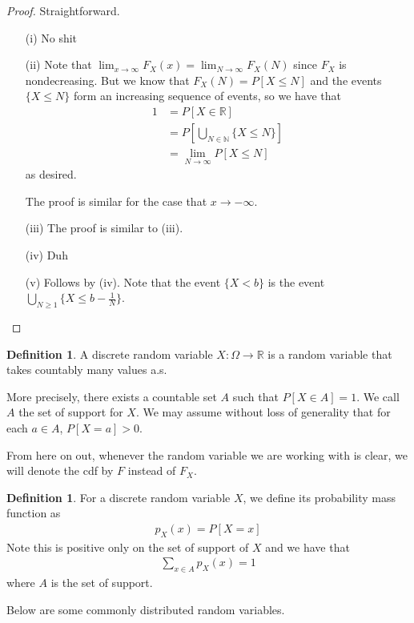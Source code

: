 \documentclass[11pt]{amsart}
\theoremstyle{definition}
\newtheorem{definition}[theorem]{Definition}
\numberwithin{equation}{section}
\begin{document}
\begin{proof} Straightforward.
    \begin{enumerate}
        \item [(i)] No shit
        \item [(ii)] Note that $\lim_{x\to\infty}F_X(x)=\lim_{N\to\infty}F_X(N)$ since $F_X$ is nondecreasing. But we know that $F_X(N)=P[X\le N]$ and the events $\{X\le N\}$ form an increasing sequence of events, so we have that 
        \begin{align*}
            1&=P[X\in\mathbb R]\\
            &=P[\bigcup_{N\in\mathbb N} \{X\le N\}]\\
            &=\lim_{N\to\infty}P[X\le N]
        \end{align*}
        as desired.

        The proof is similar for the case that $x\to-\infty$.
        \item [(iii)] The proof is similar to (iii).
        \item [(iv)] Duh
        \item [(v)] Follows by (iv). Note that the event $\{X<b\}$ is the event $\bigcup_{N\ge 1}\{X\le b-\frac{1}{N}\}$.
    \end{enumerate}
\end{proof}
\begin{definition}
    A discrete random variable $X:\Omega\to\mathbb R$ is a random variable that takes countably many values a.s.

    More precisely, there exists a countable set $A$ such that $P[X\in A]=1$. We call $A$ the set of support for $X$. We may assume without loss of generality that for each $a\in A$, $P[X=a]>0$.
\end{definition}
From here on out, whenever the random variable we are working with is clear, we will denote the cdf by $F$ instead of $F_X$.
\begin{definition}
    For a discrete random variable $X$, we define its probability mass function as
    \begin{align*}
        p_X(x)=P[X=x]
    \end{align*}
    Note this is positive only on the set of support of $X$ and we have that
    \begin{align*}
        \sum_{x\in A}p_X(x)=1
    \end{align*}
    where $A$ is the set of support.
\end{definition}
Below are some commonly distributed random variables.
\end{document}
